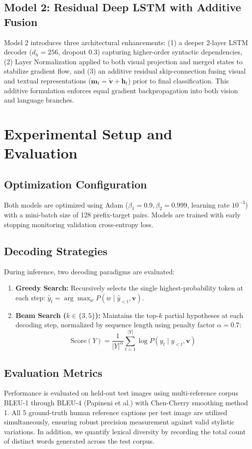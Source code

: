 \documentclass[conference]{IEEEtran}
\begin{document}
\subsection{Model 2: Residual Deep LSTM with Additive Fusion}
Model 2 introduces three architectural enhancements: (1) a deeper 2-layer LSTM decoder ($d_h = 256$, dropout 0.3) capturing higher-order syntactic dependencies, (2) Layer Normalization applied to both visual projection and merged states to stabilize gradient flow, and (3) an additive residual skip-connection fusing visual and textual representations ($\mathbf{m}_t = \tilde{\mathbf{v}} + \mathbf{h}_t$) prior to final classification. This additive formulation enforces equal gradient backpropagation into both vision and language branches.

\section{Experimental Setup and Evaluation}
\subsection{Optimization Configuration}
Both models are optimized using Adam ($\beta_1=0.9, \beta_2=0.999$, learning rate $10^{-3}$) with a mini-batch size of 128 prefix-target pairs. Models are trained with early stopping monitoring validation cross-entropy loss.

\subsection{Decoding Strategies}
During inference, two decoding paradigms are evaluated:
\begin{enumerate}
    \item \textbf{Greedy Search:} Recursively selects the single highest-probability token at each step: $\hat{y}_t = \arg\max_{w} P(w \mid \hat{y}_{<t}, \mathbf{v})$.
    \item \textbf{Beam Search ($k \in \{3, 5\}$):} Maintains the top-$k$ partial hypotheses at each decoding step, normalized by sequence length using penalty factor $\alpha = 0.7$:
    \begin{equation}
    \text{Score}(Y) = \frac{1}{|Y|^\alpha} \sum_{t=1}^{|Y|} \log P(y_t \mid y_{<t}, \mathbf{v})
    \end{equation}
\end{enumerate}

\subsection{Evaluation Metrics}
Performance is evaluated on held-out test images using multi-reference corpus BLEU-1 through BLEU-4 (Papineni et al.) with Chen-Cherry smoothing method 1. All 5 ground-truth human reference captions per test image are utilized simultaneously, ensuring robust precision measurement against valid stylistic variations. In addition, we quantify lexical diversity by recording the total count of distinct words generated across the test corpus.
\end{document}
